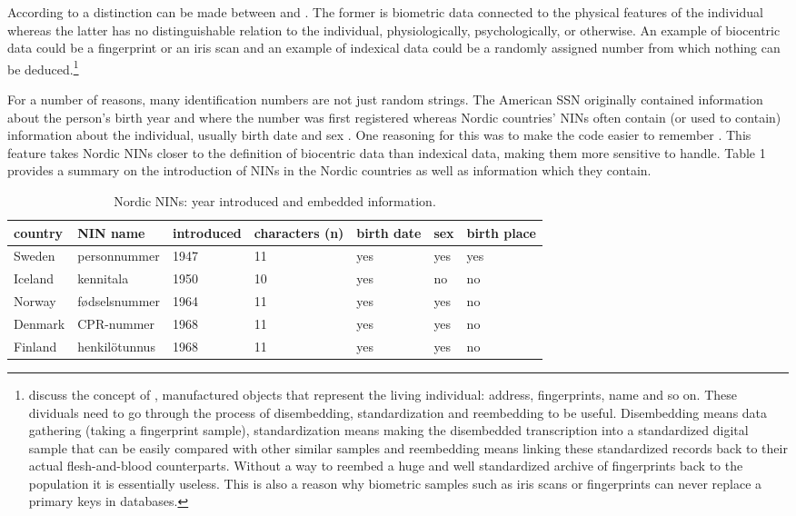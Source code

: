 According to \citet{Alterman2003} a distinction can be made between  and . The former is biometric data connected to the physical features of the individual whereas the latter has no distinguishable relation to the individual, physiologically, psychologically, or otherwise. An example of biocentric data could be a fingerprint or an iris scan and an example of indexical data could be a randomly assigned number from which nothing can be deduced.\footnote{\citet{brensinger2021} discuss the concept of , manufactured objects that represent the living individual: address, fingerprints, name and so on. These dividuals need to go through the process of disembedding, standardization and reembedding to be useful. Disembedding means data gathering (taking a fingerprint sample), standardization means making the disembedded transcription into a standardized digital sample that can be easily compared with other similar samples and reembedding means linking these standardized records back to their actual flesh-and-blood counterparts. Without a way to reembed a huge and well standardized archive of fingerprints back to the population it is essentially useless. This is also a reason why biometric samples such as iris scans or fingerprints can never replace a primary keys in databases.}

For a number of reasons, many identification numbers are not just random strings. The American SSN originally contained information about the person's birth year and where the number was first registered \citep[32]{brensinger2021} whereas Nordic countries' NINs often contain (or used to contain) information about the individual, usually birth date and sex \citep{watson2010, salste2021}. One reasoning for this was to make the code easier to remember \citep{alastalo2022}. This feature takes Nordic NINs closer to the definition of biocentric data than indexical data, making them more sensitive to handle. Table 1 provides a summary on the introduction of NINs in the Nordic countries as well as information which they contain.

\begin{table}[ht]
\centering
\begin{tabular}{lllllll}
\toprule
  country & NIN name & introduced & characters (n) & birth date & sex & birth place \\
  \hline
  Sweden & personnummer & 1947 & 11 & yes & yes & yes\\
  Iceland & kennitala & 1950 & 10 & yes & no & no \\
  Norway & fødselsnummer & 1964 & 11 & yes & yes & no \\
  Denmark & CPR-nummer & 1968 & 11 & yes & yes & no \\
  Finland & henkilötunnus & 1968 & 11 & yes & yes & no \\
\bottomrule
\end{tabular}
\caption{Nordic NINs: year introduced and embedded information.}
\label{tab:nordiccomparison}
\end{table}

